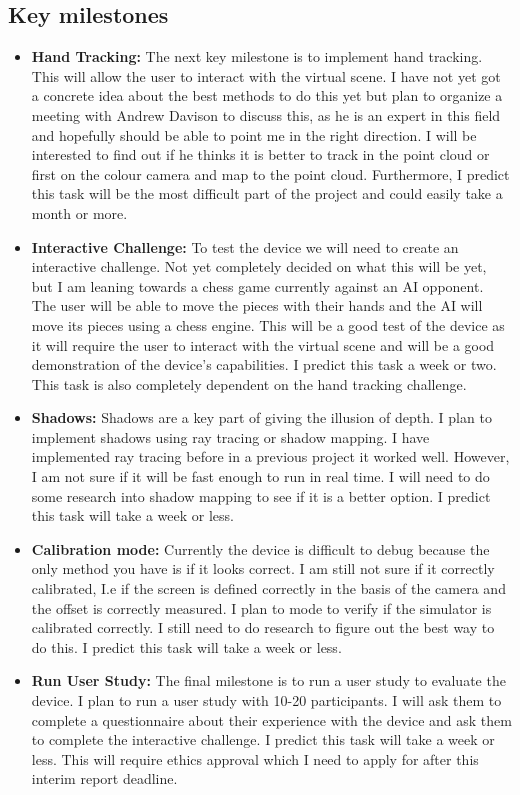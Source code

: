 \subsection{Key milestones}
\begin{itemize}
    \item \textbf{Hand Tracking:} The next key milestone is to implement hand tracking. This will allow the user to interact with the virtual scene. I have not yet got a concrete idea about the best methods to do this yet but plan to organize a meeting with Andrew Davison to discuss this, as he is an expert in this field and hopefully should be able to point me in the right direction. I will be interested to find out if he thinks it is better to track in the point cloud or first on the colour camera and map to the point cloud. Furthermore, I predict this task will be the most difficult part of the project and could easily take a month or more.

    \item \textbf{Interactive Challenge:} To test the device we will need to create an interactive challenge. Not yet completely decided on what this will be yet, but I am leaning towards a chess game currently against an AI opponent. The user will be able to move the pieces with their hands and the AI will move its pieces using a chess engine. This will be a good test of the device as it will require the user to interact with the virtual scene and will be a good demonstration of the device's capabilities. I predict this task a week or two. This task is also completely dependent on the hand tracking challenge.

    \item \textbf{Shadows:} Shadows are a key part of giving the illusion of depth. I plan to implement shadows using ray tracing or shadow mapping. I have implemented ray tracing before in a previous project it worked well. However, I am not sure if it will be fast enough to run in real time. I will need to do some research into shadow mapping to see if it is a better option. I predict this task will take a week or less.

    \item \textbf{Calibration mode:} Currently the device is difficult to debug because the only method you have is if it looks correct. I am still not sure if it correctly calibrated, I.e if the screen is defined correctly in the basis of the camera and the offset is correctly measured. I plan to mode to verify if the simulator is calibrated correctly. I still need to do research to figure out the best way to do this. I predict this task will take a week or less.
    
    \item \textbf{Run User Study:} The final milestone is to run a user study to evaluate the device. I plan to run a user study with 10-20 participants. I will ask them to complete a questionnaire about their experience with the device and ask them to complete the interactive challenge. I predict this task will take a week or less. This will require ethics approval which I need to apply for after this interim report deadline.
\end{itemize}

